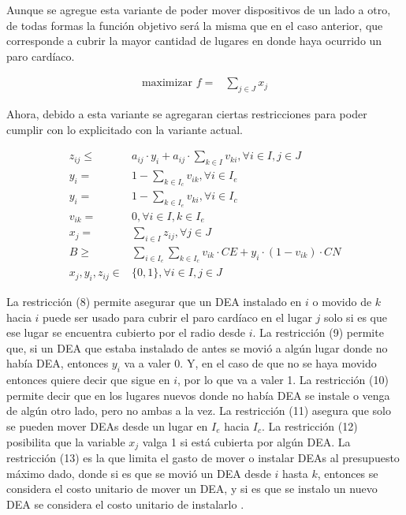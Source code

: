 \documentclass[letter, 10pt]{article}
\begin{document}
Aunque se agregue esta variante de poder mover dispositivos de un lado a otro, de todas formas la funci\'on objetivo ser\'a la misma que en el caso anterior, que corresponde a cubrir la mayor cantidad de lugares en donde haya ocurrido un paro card\'iaco.

\begin{align}
    \text{maximizar } f =& \sum_{j \in J} x_j
\end{align}

Ahora, debido a esta variante se agregaran ciertas restricciones para poder cumplir con lo explicitado con la variante actual.

\begin{align}
    z_{ij} \leq& a_{ij} \cdot y_{i} + a_{ij}\cdot \sum_{k \in I} v_{ki}, \forall i \in I, j \in J\\
    y_{i} =& 1 - \sum_{k \in I_{c}} v_{ik}, \forall i \in I_{e}\\
    y_{i} =& 1 - \sum_{k \in I_{e}} v_{ki}, \forall i \in I_{c}\\
    v_{ik} =& 0, \forall i \in I, k \in I_{e}\\
    x_{j} =& \sum_{i \in I} z_{ij}, \forall j \in J\\
    B \geq&\sum_{i \in I_{e}} \sum_{k \in I_{c}} v_{ik} \cdot CE + y_{i}\cdot(1 - v_{ik}) \cdot CN\\
    x_{j}, y_{i}, z_{ij} \in& \{0,1\}, \forall i \in I, j \in J
\end{align}

La restricci\'on (8) permite asegurar que un DEA instalado en $i$ o movido de $k$ hacia $i$ puede ser usado para cubrir el paro card\'iaco en el lugar $j$ solo si es que ese lugar se encuentra cubierto por el radio desde $i$. La restricci\'on (9) permite que, si un DEA que estaba instalado de antes se movi\'o a alg\'un lugar donde no hab\'ia DEA, entonces $y_{i}$ va a valer 0. Y, en el caso de que no se haya movido entonces quiere decir que sigue en $i$, por lo que va a valer 1. La restricci\'on (10) permite decir que en los lugares nuevos donde no hab\'ia DEA se instale o venga de alg\'un otro lado, pero no ambas a la vez. La restricci\'on (11) asegura que solo se pueden mover DEAs desde un lugar en $I_{e}$ hacia $I_{c}$. La restricci\'on (12) posibilita que la variable $x_{j}$ valga 1 si est\'a cubierta por alg\'un DEA. La restricci\'on (13) es la que limita el gasto de mover o instalar DEAs al presupuesto m\'aximo dado, donde si es que se movi\'o un DEA desde $i$ hasta $k$, entonces se considera el costo unitario de mover un DEA, y si es que se instalo un nuevo DEA se considera el costo unitario de instalarlo \cite{Tierney}.
\end{document}
